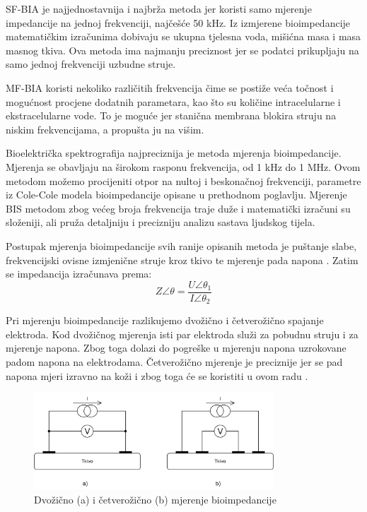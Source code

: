 \documentclass[../diplomski_rad.tex]{subfiles}
\begin{document}
SF-BIA je najjednostavnija i najbrža metoda jer koristi samo mjerenje impedancije na jednoj frekvenciji, najčešće 50 kHz. 
Iz izmjerene bioimpedancije matematičkim izračunima dobivaju se ukupna tjelesna voda, mišićna masa i masa masnog tkiva. 
Ova metoda ima najmanju preciznost jer se podatci prikupljaju na samo jednoj frekvenciji uzbudne struje.

MF-BIA koristi nekoliko različitih frekvencija čime se postiže veća točnost i mogućnost procjene dodatnih parametara, 
kao što su količine intracelularne i ekstracelularne vode. To je moguće jer stanična membrana blokira struju na niskim frekvencijama, 
a propušta ju na višim. 

Bioelektrička spektrografija najpreciznija je metoda mjerenja bioimpedancije. 
Mjerenja se obavljaju na širokom rasponu frekvencija, od 1 kHz do 1 MHz.  
Ovom metodom možemo procijeniti otpor na nultoj i beskonačnoj frekvenciji, parametre iz Cole-Cole modela bioimpedancije 
opisane u prethodnom poglavlju. 
Mjerenje BIS metodom zbog većeg broja frekvencija traje duže i matematički izračuni su složeniji, 
ali pruža  detaljniju i precizniju analizu sastava ljudskog tijela.

Postupak mjerenja bioimpedancije svih ranije opisanih metoda je puštanje slabe, 
frekvencijski ovisne izmjenične struje kroz tkivo te mjerenje pada napona \cite{Bera2014}. 
Zatim se impedancija izračunava prema:
\begin{equation}
    \label{jed:prvajednadzba}
    Z\angle\theta = \frac{U\angle\theta_{1}}{I\angle\theta_{2}} 
\end{equation} 

Pri mjerenju bioimpedancije razlikujemo dvožično i četverožično spajanje elektroda. 
Kod dvožičnog mjerenja isti par elektroda služi za pobudnu struju i za mjerenje napona. 
Zbog toga dolazi do pogreške u mjerenju napona uzrokovane padom napona na elektrodama. 
Četverožično mjerenje je preciznije jer se pad napona mjeri izravno na koži i zbog toga će se koristiti u ovom radu \cite{Abasi2022}. 

\begin{figure}[htb]
    \centering
    \includegraphics[width=0.8\textwidth]{Figures/dvo_vs_cetverozicno.png} 
    \caption{Dvožično (a) i četverožično (b) mjerenje bioimpedancije}
    \label{slk:cole_model}
\end{figure}
\end{document}
